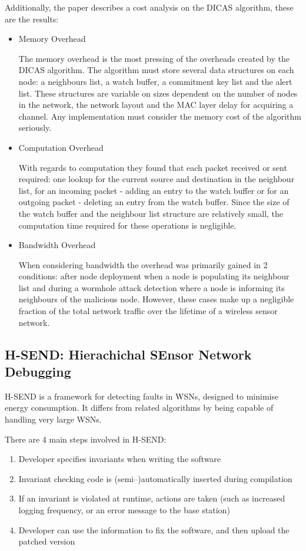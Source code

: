 Additionally, the paper describes a cost analysis on the DICAS algorithm, these are the results: 
\begin{itemize}
\item Memory Overhead

The memory overhead is the most pressing of the overheads created by the DICAS algorithm. The algorithm must store several data structures on each node: a neighbours list, a watch buffer, a commitment key list and the alert list. These structures are variable on sizes dependent on the number of nodes in the network, the network layout and the MAC layer delay for acquiring a channel. Any implementation must consider the memory cost of the algorithm seriously.

\item Computation Overhead

With regards to computation they found that each packet received or sent required: one lookup for the current source and destination in the neighbour list, for an incoming packet - adding an entry to the watch buffer or for an outgoing packet - deleting an entry from the watch buffer. Since the size of the watch buffer and the neighbour list structure are relatively small, the computation time required for these operations is negligible.

\item Bandwidth Overhead

When considering bandwidth the overhead was primarily gained in 2 conditions: after node deployment when a node is populating its neighbour list and during a wormhole attack detection where a node is informing its neighbours of the malicious node. However, these cases make up a negligible fraction of the total network traffic over the lifetime of a wireless sensor network.
\end{itemize}

\subsection{H-SEND: Hierachichal SEnsor Network Debugging}

H-SEND is a framework for detecting faults in WSNs, designed to minimise energy consumption. It differs from related algorithms by being capable of handling very large WSNs. \cite{herbert2007adaptive}

There are 4 main steps involved in H-SEND:

\begin{enumerate}
	\item Developer specifies invariants when writing the software
	\item Invariant checking code is (semi--)automatically inserted during compilation
	\item If an invariant is violated at runtime, actions are taken (such as increased logging frequency, or an error message to the base station)
	\item Developer can use the information to fix the software, and then upload the patched version
\end{enumerate}

